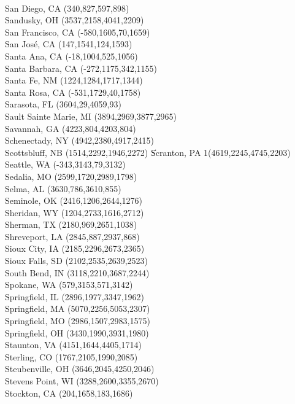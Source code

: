 \\San Diego, CA  (340,827,597,898)
\\Sandusky, OH (3537,2158,4041,2209)
\\San Francisco, CA (-580,1605,70,1659)
\\San Jos\'e, CA (147,1541,124,1593)
\\Santa Ana, CA (-18,1004,525,1056)
\\Santa Barbara, CA (-272,1175,342,1155)
\\Santa Fe, NM (1224,1284,1717,1344)
\\Santa Rosa, CA  (-531,1729,40,1758)
\\Sarasota, FL (3604,29,4059,93)
\\Sault Sainte Marie, MI (3894,2969,3877,2965)
\\Savannah, GA (4223,804,4203,804)
\\Schenectady, NY  (4942,2380,4917,2415)
\\Scottsbluff, NB (1514,2292,1946,2272)
\|Scranton, PA 1(4619,2245,4745,2203)
\\Seattle, WA (-343,3143,79,3132)
\\Sedalia, MO (2599,1720,2989,1798)
\\Selma, AL (3630,786,3610,855)
\\Seminole, OK (2416,1206,2644,1276)
\\Sheridan, WY  (1204,2733,1616,2712)
\\Sherman, TX  (2180,969,2651,1038)
\\Shreveport, LA  (2845,887,2937,868)
\\Sioux City, IA (2185,2296,2673,2365)
\\Sioux Falls, SD (2102,2535,2639,2523)
\\South Bend, IN (3118,2210,3687,2244)
\\Spokane, WA (579,3153,571,3142)
\\Springfield, IL (2896,1977,3347,1962)
\\Springfield, MA (5070,2256,5053,2307)
\\Springfield, MO (2986,1507,2983,1575)
\\Springfield, OH (3430,1990,3931,1980)
\\Staunton, VA (4151,1644,4405,1714)
\\Sterling, CO (1767,2105,1990,2085)
\\Steubenville, OH (3646,2045,4250,2046)
\\Stevens Point, WI (3288,2600,3355,2670)
\\Stockton, CA (204,1658,183,1686)
